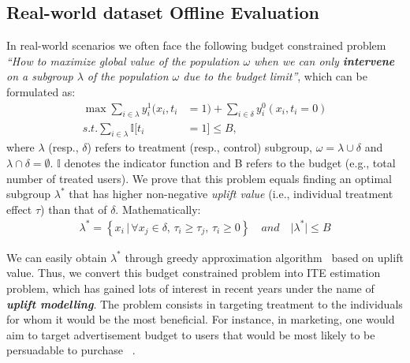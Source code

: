 \documentclass[sigconf]{acmart}
\begin{document}
\subsection{Real-world dataset Offline Evaluation}
In real-world scenarios we often face the following budget constrained problem \textit{“How to maximize global value of the population $\omega$ when we can only \textbf{intervene} on a subgroup $\lambda$ of the population $\omega$ due to the budget limit”}, which can be formulated as: 
\begin{equation}
\begin{split}
\max \sum_{i \in \lambda}y^{1}_{i}(x_{i},t_{i}&=1) + \sum_{i \in \delta}y^{0}_{i}(x_{i},t_{i}=0)\\
s.t.\sum_{i \in \lambda } \mathbb{I}[t_{i}&=1]\leq B,
\end{split}
\end{equation}
where $\lambda$ (resp., $\delta$) refers to treatment (resp., control) subgroup, $\omega = \lambda \cup \delta$ and $\lambda \cap \delta = \emptyset$. $\mathbb{I}$ denotes the indicator function and B refers to the budget (e.g., total number of treated users). We prove that this problem equals finding an optimal subgroup $\lambda^{*}$ that has higher non-negative \textit{uplift value} (i.e., individual treatment effect $\tau$) than that of $\delta$. Mathematically:
\begin{equation}
\begin{split}
\lambda^{*}=\left \{x_{i} \,| \,\forall x_{j} \in \delta, \, \tau_{i} \geqslant \tau_{j}, \, \tau_{i} \geqslant 0 \right \} \quad and \quad \lvert \lambda^{*} \rvert \leqslant  B
\end{split}
\end{equation}\par
We can easily obtain $\lambda^{*}$ through greedy approximation algorithm~\citep{Dantzig1957DiscreteVariableEP} based on uplift value. Thus, we convert this budget constrained problem into ITE estimation problem, which has gained lots of interest in recent years under the name of \textit{\textbf{uplift modelling}}. The problem consists in targeting treatment to the individuals for whom it would be the most beneficial. For instance, in marketing, one would aim to target advertisement budget to users that would be most likely to be persuadable to purchase ~\citep{betlei2020treatment}.\par
\end{document}
